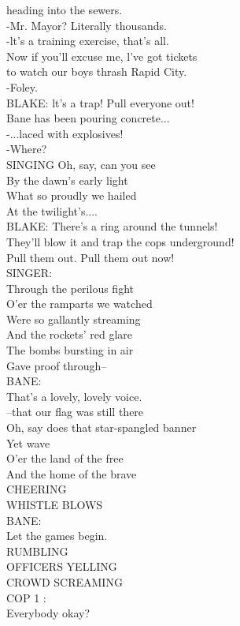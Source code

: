 \documentclass{article}
\begin{document}
\begin{multicols}{3}
heading into the sewers.\\
-Mr. Mayor? Literally thousands.\\
-lt's a training exercise, that's all.\\
Now if you'll excuse me, l've got tickets\\
to watch our boys thrash Rapid City.\\
-Foley.\\
BLAKE: lt's a trap! Pull everyone out!\\
Bane has been pouring concrete...\\
-...laced with explosives!\\
-Where?\\
SINGING Oh, say, can you see\\
By the dawn's early light\\
What so proudly we hailed\\
At the twilight's....\\
BLAKE: There's a ring around the tunnels!\\
They'll blow it and trap the cops underground!\\
Pull them out. Pull them out now!\\
SINGER:\\
Through the perilous fight\\
O'er the ramparts we watched\\
Were so gallantly streaming\\
And the rockets' red glare\\
The bombs bursting in air\\
Gave proof through--\\
BANE:\\
That's a lovely, lovely voice.\\
--that our flag was still there\\
Oh, say does that star-spangled banner\\
Yet wave\\
O'er the land of the free\\
And the home of the brave\\
CHEERING\\
WHISTLE BLOWS\\
BANE:\\
Let the games begin.\\
RUMBLING\\
OFFICERS YELLING\\
CROWD SCREAMING\\
COP 1 :\\
Everybody okay?\\

\end{multicols}
\end{document}
